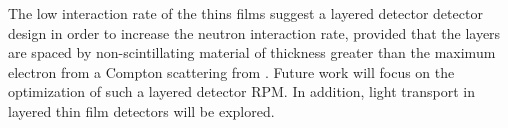 \documentclass[draftcls,onecolumn]{IEEEtran}
\begin{document}
The low interaction rate of the thins films suggest a layered detector detector design in order to increase the neutron interaction rate, provided that the layers are spaced by non-scintillating material of thickness greater than the maximum electron from a Compton scattering from .
Future work will focus on the optimization of such a layered detector RPM.
In addition, light transport in layered thin film detectors will be explored.


\end{document}

